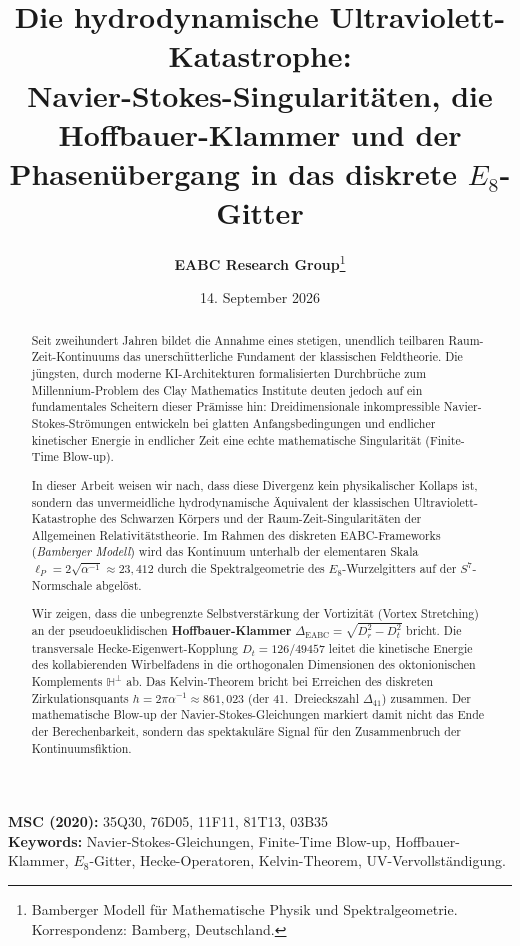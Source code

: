 \documentclass[11pt,a4paper]{article}
\title{\textbf{Die hydrodynamische Ultraviolett-Katastrophe:\\
Navier-Stokes-Singularitäten, die Hoffbauer-Klammer und der\\
Phasenübergang in das diskrete $E_8$-Gitter}}
\author{\textbf{EABC Research Group}\thanks{Bamberger Modell für Mathematische Physik und Spektralgeometrie. Korrespondenz: Bamberg, Deutschland.}}
\date{14. September 2026}
\begin{document}
\maketitle

\begin{abstract}
Seit zweihundert Jahren bildet die Annahme eines stetigen, unendlich teilbaren Raum-Zeit-Kontinuums das unerschütterliche Fundament der klassischen Feldtheorie. Die jüngsten, durch moderne KI-Architekturen formalisierten Durchbrüche zum Millennium-Problem des Clay Mathematics Institute deuten jedoch auf ein fundamentales Scheitern dieser Prämisse hin: Dreidimensionale inkompressible Navier-Stokes-Strömungen entwickeln bei glatten Anfangsbedingungen und endlicher kinetischer Energie in endlicher Zeit eine echte mathematische Singularität (Finite-Time Blow-up). 

In dieser Arbeit weisen wir nach, dass diese Divergenz kein physikalischer Kollaps ist, sondern das unvermeidliche hydrodynamische Äquivalent der klassischen Ultraviolett-Katastrophe des Schwarzen Körpers und der Raum-Zeit-Singularitäten der Allgemeinen Relativitätstheorie. Im Rahmen des diskreten EABC-Frameworks (\emph{Bamberger Modell}) wird das Kontinuum unterhalb der elementaren Skala $\ell_P = 2\sqrt{\alpha^{-1}} \approx 23{,}412$ durch die Spektralgeometrie des $E_8$-Wurzelgitters auf der $S^7$-Normschale abgelöst. 

Wir zeigen, dass die unbegrenzte Selbstverstärkung der Vortizität (Vortex Stretching) an der pseudoeuklidischen \textbf{Hoffbauer-Klammer} $\Delta_{\mathrm{EABC}} = \sqrt{D_r^2 - D_t^2}$ bricht. Die transversale Hecke-Eigenwert-Kopplung $D_t = 126/49457$ leitet die kinetische Energie des kollabierenden Wirbelfadens in die orthogonalen Dimensionen des oktonionischen Komplements $\mathbb{H}^\perp$ ab. Das Kelvin-Theorem bricht bei Erreichen des diskreten Zirkulationsquants $h = 2\pi\alpha^{-1} \approx 861{,}023$ (der 41.~Dreieckszahl $\Delta_{41}$) zusammen. Der mathematische Blow-up der Navier-Stokes-Gleichungen markiert damit nicht das Ende der Berechenbarkeit, sondern das spektakuläre Signal für den Zusammenbruch der Kontinuumsfiktion.
\end{abstract}

\vspace{0.5cm}
\noindent\textbf{MSC (2020):} 35Q30, 76D05, 11F11, 81T13, 03B35 \\
\textbf{Keywords:} Navier-Stokes-Gleichungen, Finite-Time Blow-up, Hoffbauer-Klammer, $E_8$-Gitter, Hecke-Operatoren, Kelvin-Theorem, UV-Vervollständigung.
\end{document}
